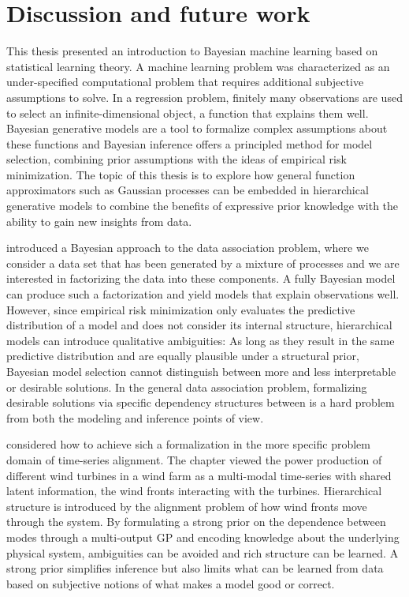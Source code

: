 \chapter{Discussion and future work}
\label{toc:discussion}
This thesis presented an introduction to Bayesian machine learning based on statistical learning theory.
A machine learning problem was characterized as an under-specified computational problem that requires additional subjective assumptions to solve.
In a regression problem, finitely many observations are used to select an infinite-dimensional object, a function that explains them well.
Bayesian generative models are a tool to formalize complex assumptions about these functions and Bayesian inference offers a principled method for model selection, combining prior assumptions with the ideas of empirical risk minimization.
The topic of this thesis is to explore how general function approximators such as Gaussian processes can be embedded in hierarchical generative models to combine the benefits of expressive prior knowledge with the ability to gain new insights from data.

 introduced a Bayesian approach to the data association problem, where we consider a data set that has been generated by a mixture of processes and we are interested in factorizing the data into these components.
A fully Bayesian model can produce such a factorization and yield models that explain observations well.
However, since empirical risk minimization only evaluates the predictive distribution of a model and does not consider its internal structure, hierarchical models can introduce qualitative ambiguities:
As long as they result in the same predictive distribution and are equally plausible under a structural prior, Bayesian model selection cannot distinguish between more and less interpretable or desirable solutions.
In the general data association problem, formalizing desirable solutions via specific dependency structures between is a hard problem from both the modeling and inference points of view.

 considered how to achieve sich a formalization in the more specific problem domain of time-series alignment.
The chapter viewed the power production of different wind turbines in a wind farm as a multi-modal time-series with shared latent information, the wind fronts interacting with the turbines.
Hierarchical structure is introduced by the alignment problem of how wind fronts move through the system.
By formulating a strong prior on the dependence between modes through a multi-output GP and encoding knowledge about the underlying physical system, ambiguities can be avoided and rich structure can be learned.
A strong prior simplifies inference but also limits what can be learned from data based on subjective notions of what makes a model good or correct.

